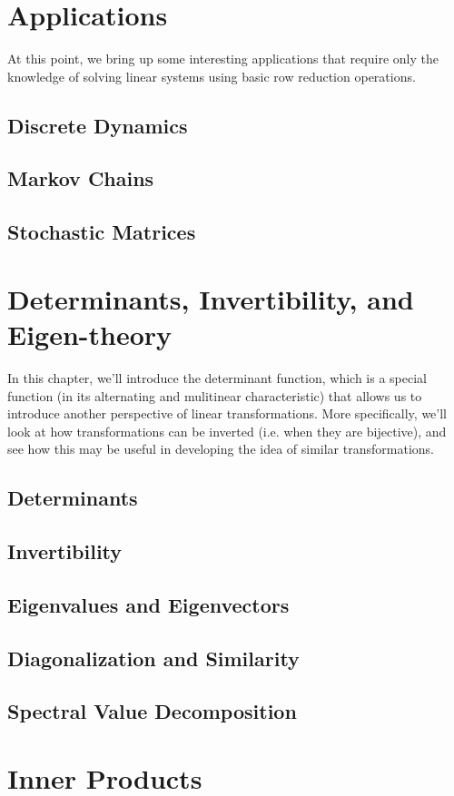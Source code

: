\documentclass[11pt]{report}
\begin{document}
\chapter{Applications}
At this point, we bring up some interesting applications that require only the knowledge of solving linear systems using basic row reduction operations.
\section{Discrete Dynamics}
\section{Markov Chains}
\section{Stochastic Matrices}


\chapter{Determinants, Invertibility, and Eigen-theory}
In this chapter, we'll introduce the determinant function, which is a special function (in its alternating and mulitinear characteristic) that allows us to introduce another perspective of linear transformations. More specifically, we'll look at how transformations can be inverted (i.e. when they are bijective), and see how this may be useful in developing the idea of similar transformations.
\section{Determinants}
\section{Invertibility}
\section{Eigenvalues and Eigenvectors}
\section{Diagonalization and Similarity}
\section{Spectral Value Decomposition}


\chapter{Inner Products}
\end{document}
